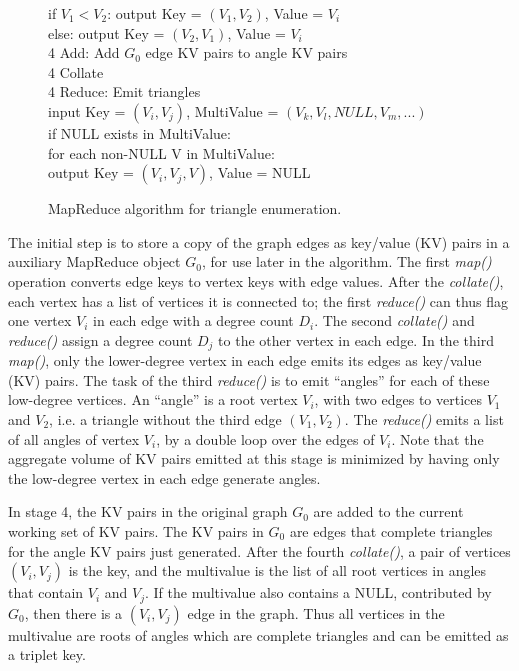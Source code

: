 \begin{figure}[htb]
\begin{center}
{\begin{minipage}{\textwidth}
\begin{tabbing}
	      \> \> \> \> if $V_1 < V_2$: output Key = $(V_1,V_2)$, Value = $V_i$ \\
	      \> \> \> \> else: output Key = $(V_2,V_1)$, Value = $V_i$ \\
4 Add: \> Add $G_0$ edge KV pairs to angle KV pairs \\
4 Collate \\
4 Reduce: \> Emit triangles \\
              \> \> input Key = $(V_i,V_j)$, MultiValue = $(V_k,V_l,NULL,V_m,...)$ \\
              \> \> if NULL exists in MultiValue: \\
	      \> \> \> for each non-NULL V in MultiValue: \\
	      \> \> \> \> output Key = $(V_i,V_j,V)$, Value = NULL

  \end{tabbing}
 \end{minipage}}\end{center}

 \caption{MapReduce algorithm for triangle enumeration.}

 \label{fig:tri}
\end{figure}

The initial step is to store a copy of the graph edges as key/value
(KV) pairs in a auxiliary MapReduce object $G_0$, for use later in the
algorithm.  The first {\it map()} operation converts edge keys to
vertex keys with edge values.  After the {\it collate()}, each vertex
has a list of vertices it is connected to; the first {\it reduce()}
can thus flag one vertex $V_i$ in each edge with a degree count $D_i$.
The second {\it collate()} and {\it reduce()} assign a degree count
$D_j$ to the other vertex in each edge.  In the third {\it map()},
only the lower-degree vertex in each edge emits its edges as key/value
(KV) pairs.  The task of the third {\it reduce()} is to emit
``angles'' for each of these low-degree vertices.  An ``angle'' is a
root vertex $V_i$, with two edges to vertices $V_1$ and $V_2$, i.e. a
triangle without the third edge $(V_1,V_2)$.  The {\it reduce()} emits
a list of all angles of vertex $V_i$, by a double loop over the edges
of $V_i$.  Note that the aggregate volume of KV pairs emitted at this
stage is minimized by having only the low-degree vertex in each edge
generate angles.

In stage 4, the KV pairs in the original graph $G_0$ are added to the
current working set of KV pairs.  The KV pairs in $G_0$ are edges that
complete triangles for the angle KV pairs just generated.  After the
fourth {\it collate()}, a pair of vertices $(V_i,V_j)$ is the key, and
the multivalue is the list of all root vertices in angles that contain
$V_i$ and $V_j$.  If the multivalue also contains a NULL, contributed
by $G_0$, then there is a $(V_i,V_j)$ edge in the graph.  Thus all
vertices in the multivalue are roots of angles which are complete
triangles and can be emitted as a triplet key.

